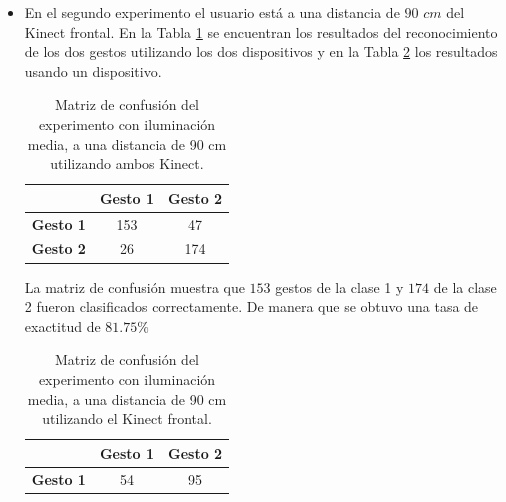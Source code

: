 \begin{itemize}
La matriz de confusión muestra que $136$ gestos de la clase 1 y $193$ de la clase 2 fueron clasificados correctamente. De manera que se obtuvo una tasa de exactitud de $82.25 \%$  

En este caso se observa una mejor exactitud cuando se utiliza solo un Kinect. 


\item En el segundo experimento el usuario est\'a a una distancia de $90$ $cm$ del Kinect frontal. En la Tabla \ref{table:90LMK2} se encuentran los resultados del reconocimiento de los dos gestos utilizando los dos dispositivos y en la Tabla \ref{table:90LMK1} los resultados usando un dispositivo.     


\begin{table}[h!] 
\begin{center} 
\caption{Matriz de confusión del experimento con iluminación media, a una distancia de 90 cm utilizando ambos Kinect.} 
\label{table:90LMK2}
\renewcommand{\arraystretch}{1.2}
\begin{tabular}{ r || c  c }  
        & \textbf{Gesto 1} & \textbf{Gesto 2} \\ \hline \hline  
\textbf{Gesto 1} & 153     &  47     \\ \hline  
\textbf{Gesto 2} & 26      & 174     \\   
\end{tabular}
\end{center} 
\end{table}

La matriz de confusión muestra que $153$ gestos de la clase 1 y $174$ de la clase 2 fueron clasificados correctamente. De manera que se obtuvo una tasa de exactitud de $81.75 \%$ 

\begin{table}[h!] 
\begin{center} 
\caption{Matriz de confusión del experimento con iluminación media, a una distancia de 90 cm utilizando el Kinect frontal.} 
\label{table:90LMK1} 
\renewcommand{\arraystretch}{1.2}
\begin{tabular}{ r || c  c } 
        & \textbf{Gesto 1} & \textbf{Gesto 2} \\ \hline \hline  
\textbf{Gesto 1} &  54    &   95    \\ \hline  
\end{tabular}
\end{center} 
\end{table}  


\end{itemize}
